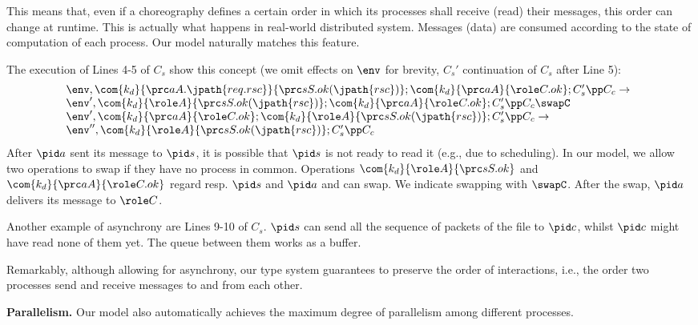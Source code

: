 This means that, even if a choreography defines a certain order in which its
processes shall receive (read) their messages, this order can change at
runtime. This is actually what happens in real-world distributed system.
Messages (data) are consumed according to the state of computation of each
process. Our model naturally matches this feature.

The execution of Lines 4-5 of $C_s$ show this concept (we omit
effects on $\env$ for brevity, $C_s'$ continuation of $C_s$ after Line 5):
{\footnotesize
$$
\hspace{-.5em}\begin{array}{l}
 \env, \com{k_d}{\prc aA.\jpath{req.rsc}}{\prc sS.ok(\jpath{rsc})};
\com{k_d}{\prc aA}{\role C.ok};C_s'\pp C_c
\to
\\ \env', \com{k_d}{\role A}{\prc sS.ok(\jpath{rsc})};
\com{k_d}{\prc aA}{\role C.ok};C_s'\pp C_c
\swapC
\\ \env', \com{k_d}{\prc aA}{\role C.ok};\com{k_d}{\role A}{\prc
sS.ok(\jpath{rsc})};C_s'\pp C_c
\to
\\ \env'', \com{k_d}{\role A}{\prc sS.ok(\jpath{rsc})};C_s'\pp C_c
\end{array}
$$
}
After $\pid a$ sent its message to $\pid s$, it is possible
that $\pid s$ is not ready to read it (e.g., due to scheduling). In our
model, we allow two operations to swap if they have no process in common.
Operations $\com{k_d}{\role A}{\prc sS.ok}$ and $\com{k_d}{\prc aA}{\role
C.ok}$ regard resp. $\pid s$ and $\pid a$ and can swap. We indicate swapping
with $\swapC$. After the swap, $\pid a$ delivers its message to $\role C$.

Another example of asynchrony are Lines 9-10 of $C_s$. $\pid s$ can send all
the sequence of packets of the file to $\pid c$, whilst $\pid c$ might have
read none of them yet. The queue between them works as a buffer.

Remarkably, although allowing for asynchrony, our type system guarantees to
preserve the order of interactions, i.e., the order two processes
send and receive messages to and from each other.

\textbf{Parallelism.}
Our model also automatically achieves the maximum degree of parallelism among
different processes.

